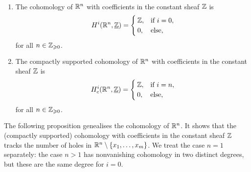 \begin{prop}[name=Cohomology of Euclidean space]~
	\begin{enumerate}
    	\item The cohomology of $\mathbb{R}^n$ with coefficients in the constant sheaf $\mathbb{Z}$ is \[
        	\cohomology^i(\bb R^n, \underline{\bb Z}) = \begin{cases}
            	\bb Z, & \text{if } i = 0,\\
                0, &\text{else},
            \end{cases}
        \] for all $n \in \mathbb{Z}_{\geqslant 0}$.
        \item The compactly supported cohomology of $\mathbb{R}^n$ with coefficients in the constant sheaf $\mathbb{Z}$ is \[
        	\cohomology_c^i(\bb R^n, \underline{\bb Z}) = \begin{cases}
            	\bb Z, & \text{if } i = n,\\
                0, & \text{else},
            \end{cases}
        \] for all $n \in \mathbb{Z}_{\geqslant 0}$. 
    \end{enumerate}

\end{prop}

The following proposition genealises the cohomology of $\mathbb{R}^n$. It shows that the (compactly supported) cohomology with coefficients in the constant sheaf $\mathbb{Z}$ tracks the number of holes in $\mathbb{R}^n\setminus \{x_1, \ldots, x_m\}$. We treat the case $n = 1$ separately: the case $n > 1$ has nonvanishing cohomology in two distinct degrees, but these are the same degree for $i = 0$.

